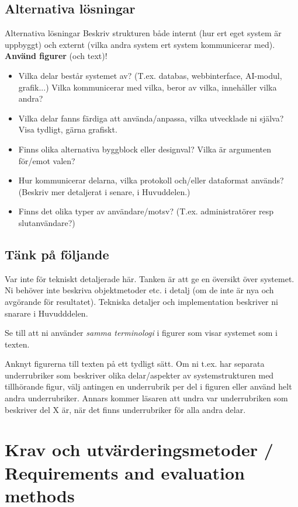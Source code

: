 \documentclass[a4paper,12pt]{article}
\begin{document}
\subsection{Alternativa lösningar}
Alternativa lösningar
Beskriv strukturen både internt (hur ert eget system är uppbyggt) och externt (vilka andra system ert system kommunicerar med). \textbf{Använd figurer} (och text)!
\begin{itemize}
\item Vilka delar består systemet av? (T.ex. databas, webbinterface, AI-modul, grafik...) Vilka kommunicerar med vilka, beror av vilka, innehåller vilka andra?
\item Vilka delar fanns färdiga att använda/anpassa, vilka utvecklade ni själva? Visa tydligt, gärna grafiskt.
\item Finns olika alternativa byggblock eller designval? Vilka är argumenten för/emot valen?
\item Hur kommunicerar delarna, vilka protokoll och/eller dataformat används? (Beskriv mer detaljerat i senare, i Huvuddelen.)
\item Finns det olika typer av användare/motsv? (T.ex. administratörer resp slut\-an\-vän\-dare?)
\end{itemize}

\subsection{Tänk på följande}

Var inte för tekniskt detaljerade här.  Tanken är att ge en översikt över systemet.  Ni behöver inte beskriva objektmetoder etc. i detalj (om de inte är nya och avgörande för resultatet). Tekniska detaljer och implementation beskriver ni snarare i Huvudddelen.


Se till att ni använder \emph{samma terminologi} i figurer som visar systemet som i texten.

Anknyt figurerna till texten på ett tydligt sätt. Om ni t.ex. har separata underrubriker som beskriver olika delar/aspekter av systemstrukturen med tillhörande figur, välj antingen en underrubrik per del i figuren eller använd helt andra underrubriker.  Annars kommer läsaren att undra var underrubriken som beskriver del X är, när det finns underrubriker för alla andra delar.

\section{Krav och utvärderingsmetoder / Requirements and evaluation methods}\label{sec:krav}
\end{document}
